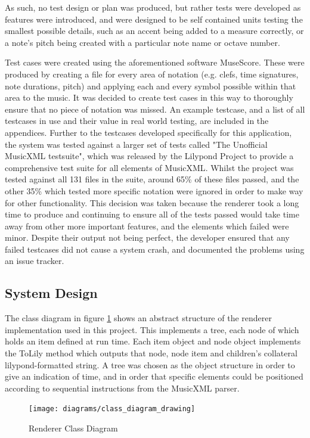 As such, no test design or plan was produced, but rather tests were developed as features were introduced, and were designed to be self contained units testing the smallest possible details, such as an accent being added to a measure correctly, or a note's pitch being created with a particular note name or octave number.

Test cases were created using the aforementioned software MuseScore. These were produced by creating a file for every area of notation (e.g. clefs, time signatures, note durations, pitch) and applying each and every symbol possible within that area to the music. It was decided to create test cases in this way to thoroughly ensure that no piece of notation was missed. An example testcase, and a list of all testcases in use and their value in real world testing, are included in the appendices.
Further to the testcases developed specifically for this application, the system was tested against a larger set of tests called "The Unofficial MusicXML testsuite", which was released by the Lilypond Project to provide a comprehensive test suite for all elements of MusicXML\parencite{LilypondTestcase}. 
Whilst the project was tested against all 131 files in the suite, around 65\% of these files passed, and the other 35\% which tested more specific notation were ignored in order to make way for other functionality. This decision was taken because the renderer took a long time to produce and continuing to ensure all of the tests passed would take time away from other more important features, and the elements which failed were minor. Despite their output not being perfect, the developer ensured that any failed testcases did not cause a system crash, and documented the problems using an issue tracker.
\subsection{System Design}
The class diagram in figure \ref{fig:classdiagram} shows an abstract structure of the renderer implementation used in this project. This implements a tree, each node of which holds an item defined at run time. Each item object and node object implements the ToLily method which outputs that node, node item and children's collateral lilypond-formatted string. A tree was chosen as the object structure in order to give an indication of time, and in order that specific elements could be positioned according to sequential instructions from the MusicXML parser. 
\begin{figure}[H]
    \centering
    \texttt{[image: diagrams/class\_diagram\_drawing]}
    \caption{Renderer Class Diagram}
    \label{fig:classdiagram}
\end{figure}

